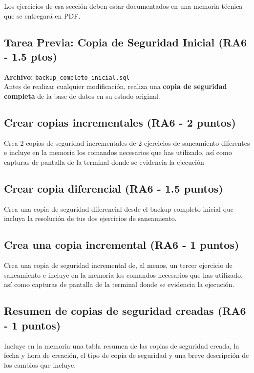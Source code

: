 \documentclass[12pt,a4paper]{article}
\begin{document}
Los ejercicios de esa sección deben estar documentados en una memoria técnica que se entregará en PDF.





\subsection{Tarea Previa: Copia de Seguridad Inicial \textcolor{RA6}{(RA6 - 1.5 ptos)}}
\textbf{Archivo:} \texttt{backup\_completo\_inicial.sql} \\
Antes de realizar cualquier modificación, realiza una \textbf{copia de seguridad completa} de la base de datos en su estado original. 

\subsection{Crear copias incrementales \textcolor{RA6}{(RA6 - 2 puntos)}}
Crea 2 copias de seguridad incrementales de 2 ejercicios de saneamiento diferentes e incluye en la memoria los comandos necesarios que has utilizado, así como capturas de pantalla de la terminal donde se evidencia la ejecución 

\subsection{Crear copia diferencial \textcolor{RA6}{(RA6 - 1.5 puntos)}}
Crea una copia de seguridad diferencial desde el backup completo inicial que incluya la resolución de tus dos ejercicios de saneamiento.

\subsection{Crea una copia incremental \textcolor{RA6}{(RA6 - 1 puntos)}}
Crea una copia de seguridad incremental de, al menos, un tercer ejercicio de saneamiento e incluye en la memoria los comandos necesarios que has utilizado, así como capturas de pantalla de la terminal donde se evidencia la ejecución.


\subsection{Resumen de copias de seguridad creadas \textcolor{RA6}{(RA6 - 1 puntos)}}
Incluye en la memoria una tabla resumen de las copias de seguridad creada, la fecha y hora de creación, el tipo de copia de seguridad y una breve descripción de los cambios que incluye.
\end{document}
